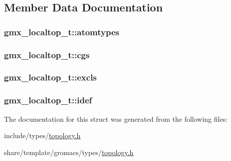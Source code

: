 \subsection{\-Member \-Data \-Documentation}
\hypertarget{structgmx__localtop__t_ae36182d83f3ec635da12842d77a36f59}{
\subsubsection[{atomtypes}]{ {\bf gmx\-\_\-localtop\-\_\-t\-::atomtypes}}}\label{structgmx__localtop__t_ae36182d83f3ec635da12842d77a36f59}
\hypertarget{structgmx__localtop__t_a9540761c2b079decf62c838e06969db8}{
\subsubsection[{cgs}]{ {\bf gmx\-\_\-localtop\-\_\-t\-::cgs}}}\label{structgmx__localtop__t_a9540761c2b079decf62c838e06969db8}
\hypertarget{structgmx__localtop__t_a9bac2d45b652cdf47491eec9f6aa6d75}{
\subsubsection[{excls}]{ {\bf gmx\-\_\-localtop\-\_\-t\-::excls}}}\label{structgmx__localtop__t_a9bac2d45b652cdf47491eec9f6aa6d75}
\hypertarget{structgmx__localtop__t_ae4ece680912af6260e30529ac9afc6a4}{
\subsubsection[{idef}]{ {\bf gmx\-\_\-localtop\-\_\-t\-::idef}}}\label{structgmx__localtop__t_ae4ece680912af6260e30529ac9afc6a4}


\-The documentation for this struct was generated from the following files\-:\begin{DoxyCompactItemize}
\item 
include/types/\hyperlink{include_2types_2topology_8h}{topology.\-h}\item 
share/template/gromacs/types/\hyperlink{share_2template_2gromacs_2types_2topology_8h}{topology.\-h}\end{DoxyCompactItemize}
